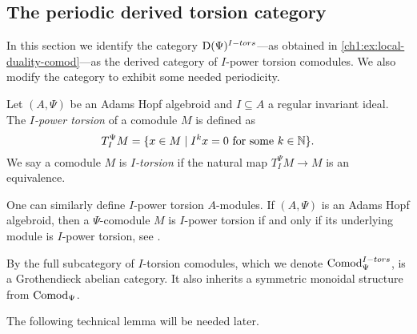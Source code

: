 









\subsection{The periodic derived torsion category}
\label{ch1:ssec:the-algebraic-model}

In this section we identify the category $\mathrm{D}(\Psi)^{I-tors}$---as obtained in \cref{ch1:ex:local-duality-comod}---as the derived category of $I$-power torsion comodules. We also modify the category to exhibit some needed periodicity. 

\begin{definition}
    \label{ch1:def:I-power-torsion-comodule}
    Let $(A,\Psi)$ be an Adams Hopf algebroid and $I\subseteq A$ a regular invariant ideal. The\emph{ $I$-power torsion} of a comodule $M$ is defined as 
    $$T_I^\Psi M = \{x\in M \mid I^kx = 0 \text{ for some } k\in \mathbb{N}\}.$$
    We say a comodule $M$ is \emph{$I$-torsion} if the natural map $T_I^\Psi M\longrightarrow M$ is an equivalence. 
\end{definition}

\begin{remark}
    \label{ch1:rm:torsion-iff-underlying-is-torsion}
    One can similarly define $I$-power torsion $A$-modules. If $(A,\Psi)$ is an Adams Hopf algebroid, then a $\Psi$-comodule $M$ is $I$-power torsion if and only if its underlying module is $I$-power torsion, see \cite[5.7]{barthel-heard-valenzuela_2018}. 
\end{remark}

\begin{remark}
    \label{ch1:rm:torsion-comodules-grothendieck-monoidal}
    By \cite[5.10]{barthel-heard-valenzuela_2018} the full subcategory of $I$-torsion comodules, which we denote $\mathrm{Comod}_\Psi^{I-tors}$, is a Grothendieck abelian category. It also inherits a symmetric monoidal structure from $\mathrm{Comod}_\Psi$. 
\end{remark}

The following technical lemma will be needed later. 

